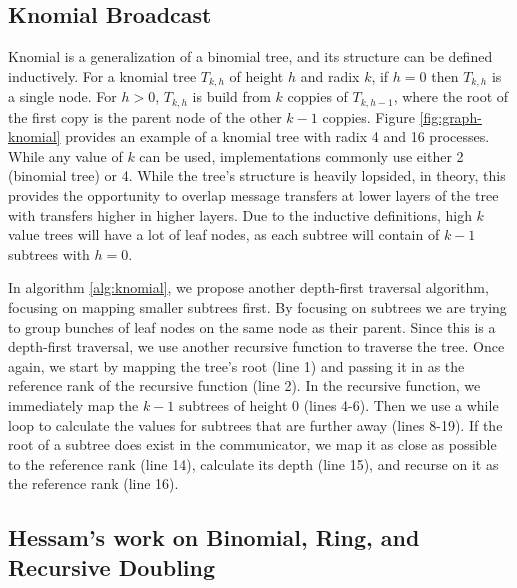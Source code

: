 \subsection{Knomial Broadcast}
Knomial is a generalization of a binomial tree, and its structure can be defined inductively.
For a knomial tree $T_{k,h}$ of height $h$ and radix $k$, if $h=0$ then $T_{k,h}$ is a single node. For $h>0$, $T_{k,h}$ is build from $k$ coppies of $T_{k,h-1}$, where the root of the first copy is the parent node of the other $k-1$ coppies.
Figure \ref{fig:graph-knomial} provides an example of a knomial tree with radix 4 and 16 processes.
While any value of $k$ can be used, implementations commonly use either 2 (binomial tree) or 4. 
While the tree's structure is heavily lopsided, in theory, this provides the opportunity to overlap message transfers at lower layers of the tree with transfers higher in higher layers.
Due to the inductive definitions, high $k$ value trees will have a lot of leaf nodes, as each subtree will contain of $k-1$ subtrees with $h=0$.

In algorithm \ref{alg:knomial}, we propose another depth-first traversal algorithm, focusing on mapping smaller subtrees first.
By focusing on subtrees we are trying to group bunches of leaf nodes on the same node as their parent.
Since this is a depth-first traversal, we use another recursive function to traverse the tree. 
Once again, we start by mapping the tree's root (line 1) and passing it in as the reference rank of the recursive function (line 2).
In the recursive function, we immediately map the $k-1$ subtrees of height 0 (lines 4-6).
Then we use a while loop to calculate the values for subtrees that are further away (lines 8-19).
If the root of a subtree does exist in the communicator, we map it as close as possible to the reference rank (line 14), calculate its depth (line 15), and recurse on it as the reference rank (line 16).


% 


\subsection{Hessam's work on Binomial, Ring, and Recursive Doubling}

